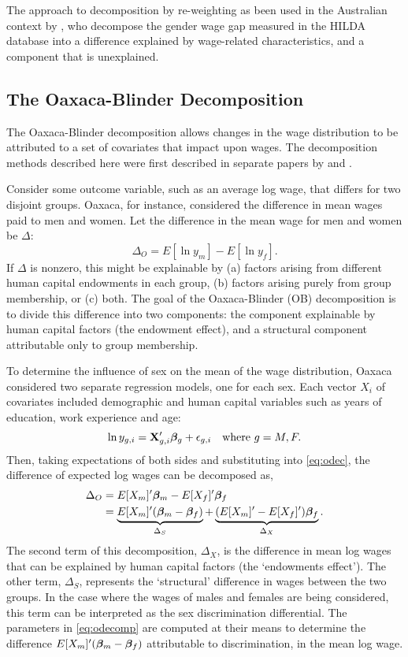 The \citet{DiNardo1996} approach to decomposition by re-weighting as been used in the Australian context by \citet{Baron2010}, who decompose the gender wage gap measured in the HILDA database into a difference explained by wage-related characteristics, and a component that is unexplained.

\subsection{The Oaxaca-Blinder Decomposition}

The Oaxaca-Blinder decomposition allows changes in the wage distribution to be attributed to a set of covariates that impact upon wages. The decomposition methods described here were first described in separate papers by \citet{Oaxaca1973} and \citet{Blinder1973}. 

Consider some outcome variable, such as an average log wage, that differs for two disjoint groups. Oaxaca, for instance, considered the difference in mean wages paid to men and women. Let the difference in the mean wage for men and women be $\Delta$:
\begin{equation} \Delta_O = E[\ln y_m] - E[\ln y_f]. \label{eq:odec} \end{equation}
If $\Delta$ is nonzero, this might be explainable by (a) factors arising from different human capital endowments in each group, (b) factors arising purely from group membership, or (c) both. The goal of the Oaxaca-Blinder (OB) decomposition is to divide this difference into two components: the component explainable by human capital factors (the endowment effect), and a structural component attributable only to group membership.

To determine the influence of sex on the mean of the wage distribution, Oaxaca considered two separate regression models, one for each sex. Each vector $X_i$ of covariates included demographic and human capital variables such as years of education, work experience and age:
$$  \ln y_{g,i} = \mathbf{X}_{g,i}'\boldsymbol{\beta}_g + \epsilon_{g,i} \quad \text{where}\ g=M,F. $$
Then, taking expectations of both sides and substituting into \eqref{eq:odec}, the difference of expected log wages can be decomposed as,
\begin{align}
  \Delta_O &= E[X_m]'\boldsymbol{\beta}_m -  E[X_f]'\boldsymbol{\beta}_f \notag \\
  &= \underbrace{E[X_m]'(\boldsymbol{\beta}_m - \boldsymbol{\beta}_f)}_{\Delta_S} + \underbrace{(E[X_m]'-E[X_f]')\boldsymbol{\beta}_f}_{\Delta_X}. \label{eq:odecomp}
\end{align}
The second term of this decomposition, $\Delta_X$, is the difference in mean log wages that can be explained by human capital factors (the `endowments effect'). The other term, $\Delta_S$, represents the `structural' difference in wages between the two groups. In the case where the wages of males and females are being considered, this term can be interpreted as the sex discrimination differential. The parameters in \eqref{eq:odecomp} are computed at their means to determine the difference $E[X_m]'(\boldsymbol{\beta}_m - \boldsymbol{\beta}_f)$ attributable to discrimination, in the mean log wage.

